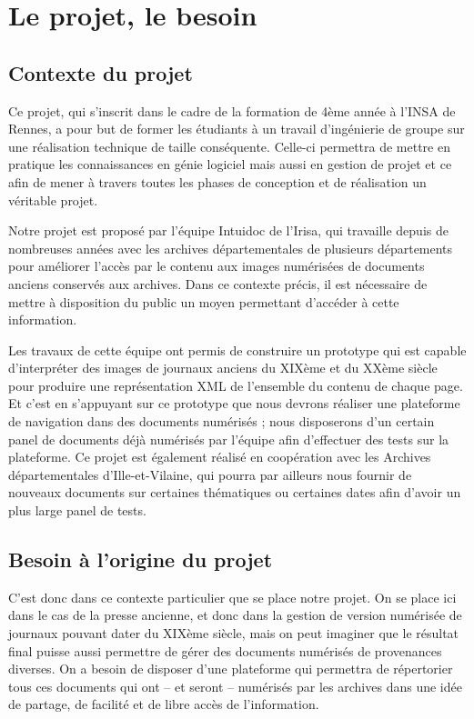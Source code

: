 \section{Le projet, le besoin}
\label{sec:intro}

    \subsection{Contexte du projet}
    \label{subsec:contexte}
    Ce projet, qui s’inscrit dans le cadre de la formation de 4ème année à l’INSA de Rennes, a pour but de former les étudiants à un travail d’ingénierie de groupe sur une réalisation technique de taille conséquente. Celle-ci permettra de mettre en pratique les connaissances en génie logiciel mais aussi en gestion de projet et ce afin de mener à travers toutes les phases de conception et de réalisation un véritable projet.

    Notre projet est proposé par l’équipe Intuidoc de l’Irisa, qui travaille depuis de nombreuses années avec les archives départementales de plusieurs départements pour améliorer l’accès par le contenu aux images numérisées de documents anciens conservés aux archives. Dans ce contexte précis, il est nécessaire de mettre à disposition du public un moyen permettant d’accéder à cette information.

    Les travaux de cette équipe ont permis de construire un prototype qui est capable d’interpréter des images de journaux anciens du XIXème et du XXème siècle pour produire une représentation XML de l’ensemble du contenu de chaque page. Et c’est en s’appuyant sur ce prototype que nous devrons réaliser une plateforme de navigation dans des documents numérisés ; nous disposerons d’un certain panel de documents déjà numérisés par l’équipe afin d’effectuer des tests sur la plateforme. Ce projet est également réalisé en coopération avec les Archives départementales d’Ille-et-Vilaine, qui pourra par ailleurs nous fournir de nouveaux documents sur certaines thématiques ou certaines dates afin d’avoir un plus large panel de tests.

    \subsection{Besoin à l'origine du projet}
    \label{subsec:besoin}
    C’est donc dans ce contexte particulier que se place notre projet. On se place ici dans le cas de la presse ancienne, et donc dans la gestion de version numérisée de journaux pouvant dater du XIXème siècle, mais on peut imaginer que le résultat final puisse aussi permettre de gérer des documents numérisés de provenances diverses. On a besoin de disposer d’une plateforme qui permettra de répertorier tous ces documents qui ont – et seront – numérisés par les archives dans une idée de partage, de facilité et de libre accès de l’information. 

